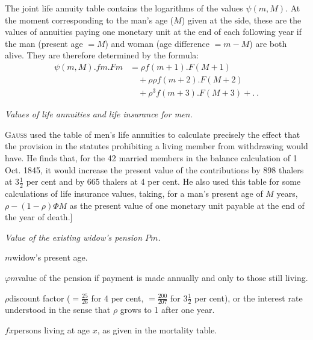The joint life annuity table contains the logarithms of the values \(\psi(m,M)\). At the moment corresponding to the man's age (\(M\)) given at the side, these are the values of annuities paying one monetary unit at the end of each following year if the man (present age \(=M\)) and woman (age difference \(=m-M\)) are both alive. They are therefore determined by the formula:
\[
\begin{aligned}
\psi(m,M)\mathord{.}fm\mathord{.}Fm&=\rho f(m+1)\mathord{.}F(M+1)\\
&\quad+\rho\rho f(m+2)\mathord{.}F(M+2)\\
&\quad+\rho^3f(m+3)\mathord{.}F(M+3)+.\ .
\end{aligned}
\]
\begin{center}\textit{Values of life annuities and life insurance for men.}\end{center}
\noindent\hspace*{1.2em} \textsc{Gauss} used the table of men's life annuities to calculate precisely the effect that the provision in the statutes prohibiting a living member from withdrawing would have. He finds that, for the 42 married members in the balance calculation of 1 Oct. 1845, it would increase the present value of the contributions by 898 thalers at \(3\tfrac{1}{2}\) per cent and by 665 thalers at 4 per cent. He also used this table for some calculations of life insurance values, taking, for a man's present age of \(M\) years, \(\rho-(1-\rho)\Phi M\) as the present value of one monetary unit payable at the end of the year of death.]

\begin{center}\textit{Value of the existing widow's pension \(Pm\).}\end{center}
\noindent \(m\)\quad widow's present age.\par
\noindent \(\varphi m\)\quad value of the pension if payment is made annually and only to those still living.\par
\noindent \(\rho\)\quad discount factor (\(=\tfrac{25}{26}\) for 4 per cent, \(=\tfrac{200}{207}\) for \(3\tfrac{1}{2}\) per cent), or the interest rate understood in the sense that \(\rho\) grows to 1 after one year.\par
\noindent \(fx\)\quad persons living at age \(x\), as given in the mortality table.

